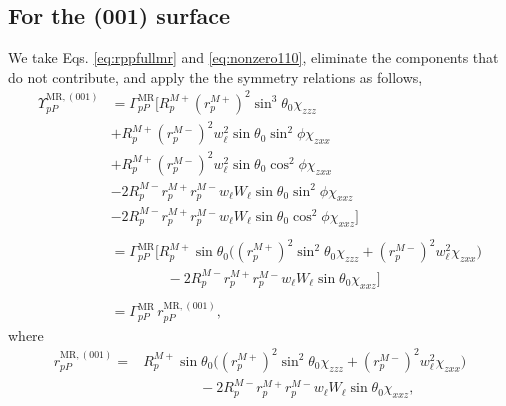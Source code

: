 \subsection{For the (001) surface}

We take Eqs. \eqref{eq:rppfullmr} and \eqref{eq:nonzero110}, eliminate the
components that do not contribute, and apply the the symmetry relations as
follows,
\begin{equation*}
\begin{split}
\Upsilon^{\mathrm{MR},(001)}_{pP} &=
\Gamma^{\mathrm{MR}}_{pP}
\big[
R^{M+}_{p}\left(r^{M+}_{p}\right)^{2}\sin^{3}\theta_{0}\chi_{zzz}\\
&+R^{M+}_{p}\left(r^{M-}_{p}\right)^{2}w^{2}_{\ell}
            \sin\theta_{0}\sin^{2}\phi\chi_{zxx}\\
&+R^{M+}_{p}\left(r^{M-}_{p}\right)^{2}w^{2}_{\ell}
            \sin\theta_{0}\cos^{2}\phi\chi_{zxx}\\
&-2R^{M-}_{p}r^{M+}_{p}r^{M-}_{p}w_{\ell}W_{\ell}
            \sin\theta_{0}\sin^{2}\phi\chi_{xxz}\\
&-2R^{M-}_{p}r^{M+}_{p}r^{M-}_{p}w_{\ell}W_{\ell}
            \sin\theta_{0}\cos^{2}\phi\chi_{xxz}
\big]\\\\
&=
\Gamma^{\mathrm{MR}}_{pP}
\big[
R^{M+}_{p}\sin\theta_{0}
\bigg(
\left(r^{M+}_{p}\right)^{2}\sin^{2}\theta_{0}\chi_{zzz}
+ \left(r^{M-}_{p}\right)^{2}w^{2}_{\ell}\chi_{zxx}
\bigg)\\
&\qquad\qquad- 2R^{M-}_{p}r^{M+}_{p}r^{M-}_{p}w_{\ell}W_{\ell}\sin\theta_{0}
\chi_{xxz}
\big]\\\\
&= \Gamma^{\mathrm{MR}}_{pP}\,r^{\mathrm{MR},(001)}_{pP},
\end{split}
\end{equation*}
where
\begin{equation}\label{eq:final-rpp.mr.001}
\begin{split}
r^{\mathrm{MR},(001)}_{pP} = 
&R^{M+}_{p}\sin\theta_{0}
\bigg(
\left(r^{M+}_{p}\right)^{2}\sin^{2}\theta_{0}\chi_{zzz}
+ \left(r^{M-}_{p}\right)^{2}w^{2}_{\ell}\chi_{zxx}
\bigg)\\
&\qquad\qquad- 2R^{M-}_{p}r^{M+}_{p}r^{M-}_{p}w_{\ell}W_{\ell}\sin\theta_{0}
\chi_{xxz},
\end{split}
\end{equation}

